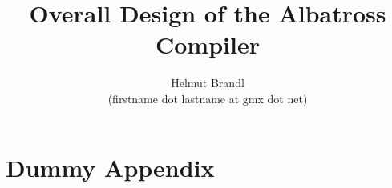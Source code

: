 \documentclass[12pt]{report}
\begin{document}
\title{Overall Design of the Albatross Compiler}
\author{Helmut Brandl \\ \scriptsize (firstname dot lastname at gmx dot net)}
\date{}

\maketitle



\tableofcontents























\appendix
\chapter{Dummy Appendix}
\end{document}
